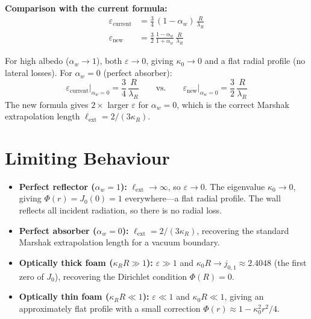 \documentclass[12pt]{article}
\newcommand{\lR}{\lambda_R}
\newcommand{\lext}{\ell_{\mathrm{ext}}}
\newcommand{\alphaW}{\alpha_w}
\begin{document}
\textbf{Comparison with the current formula:}
\begin{align}
    \varepsilon_{\mathrm{current}} &= \frac{3}{4}\,(1 - \alphaW)\,\frac{R}{\lR}
    \label{eq:eps_current} \\[6pt]
    \varepsilon_{\mathrm{new}} &= \frac{3}{2}\,\frac{1 - \alphaW}{1 + \alphaW}\,\frac{R}{\lR}
    \label{eq:eps_new}
\end{align}

For high albedo ($\alphaW \to 1$), both $\varepsilon \to 0$, giving $\kappa_0 \to 0$
and a flat radial profile (no lateral losses). For $\alphaW = 0$ (perfect absorber):
\begin{equation}
    \varepsilon_{\mathrm{current}}\big|_{\alphaW=0} = \frac{3}{4}\,\frac{R}{\lR}
    \qquad\text{vs.}\qquad
    \varepsilon_{\mathrm{new}}\big|_{\alphaW=0} = \frac{3}{2}\,\frac{R}{\lR}
\end{equation}
The new formula gives $2\times$ larger $\varepsilon$ for $\alphaW = 0$, which is the
correct Marshak extrapolation length $\lext = 2/(3\kappa_R)$.


\section{Limiting Behaviour}

\begin{itemize}
    \item \textbf{Perfect reflector ($\alphaW = 1$):} $\lext \to \infty$, so
    $\varepsilon \to 0$. The eigenvalue $\kappa_0 \to 0$, giving $\Phi(r) = J_0(0) = 1$
    everywhere---a flat radial profile. The wall reflects all incident radiation,
    so there is no radial loss. \checkmark

    \item \textbf{Perfect absorber ($\alphaW = 0$):} $\lext = 2/(3\kappa_R)$,
    recovering the standard Marshak extrapolation length for a vacuum boundary.

    \item \textbf{Optically thick foam ($\kappa_R R \gg 1$):} $\varepsilon \gg 1$
    and $\kappa_0 R \to j_{0,1} \approx 2.4048$ (the first zero of $J_0$), recovering
    the Dirichlet condition $\Phi(R) = 0$.

    \item \textbf{Optically thin foam ($\kappa_R R \ll 1$):} $\varepsilon \ll 1$
    and $\kappa_0 R \ll 1$, giving an approximately flat profile with a small
    correction $\Phi(r) \approx 1 - \kappa_0^2 r^2/4$.
\end{itemize}
\end{document}
